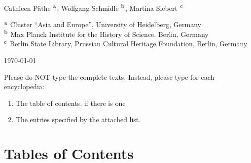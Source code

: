 \documentclass[fontsize=11pt, paper=a4, 
DIV15,
headings=normal,
parskip=half-, 
numbers=noenddot]{scrartcl}
\begin{document}
\begin{center}
{} \\[5mm]
\large Cathleen Päthe $^\textrm{\footnotesize a}$, Wolfgang Schmidle $^\textrm{\footnotesize b}$, Martina Siebert $^\textrm{\footnotesize c}$

\normalsize 


\normalsize 
$^\textrm{\footnotesize a}$ Cluster ``Asia and Europe'', University of Heidelberg, Germany \\
$^\textrm{\footnotesize b}$ Max Planck Institute for the History of Science, Berlin, Germany \\
$^\textrm{\footnotesize c}$ Berlin State Library, Prussian Cultural Heritage Foundation, Berlin, Germany

\today
\end{center}





\vspace{1cm}
Please do NOT type the complete texts. Instead, please type for each encyclopedia:
\begin{enumerate}
\item The table of contents, if there is one
\item The entries specified by the attached list. 
\end{enumerate}

\section{Tables of Contents}
\end{document}
